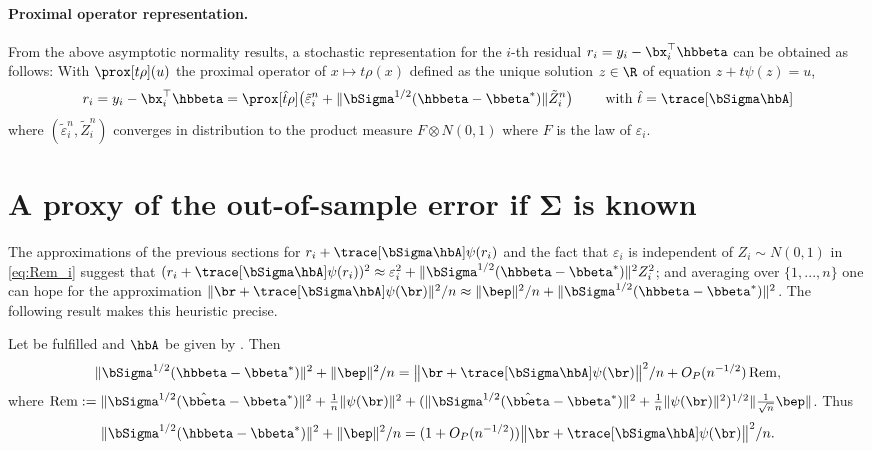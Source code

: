 \documentclass{colt2022} %
\DeclareMathOperator{\Rem}{Rem}
\def\eps{\varepsilon}
\numberwithin{equation}{section}
\begin{document}
\paragraph{Proximal operator representation.}
From the above asymptotic normality results,
a stochastic representation for the $i$-th residual
$r_i=y_i - \bx_i^\top\smash{\hbbeta}$ can be obtained as follows:
With $\prox[t\rho](u)$ the proximal operator of $x\mapsto t\rho(x)$
defined as the unique solution $z\in\R$ of equation
$z + t\psi(z) = u$,
$$
r_i = y_i - \bx_i^\top\hbbeta
= \prox[\hat t \rho]\bigl(
    \tilde \eps_i^n + \|\bSigma^{1/2}(\hbbeta-\bbeta^*)\| \tilde Z_i^n
\bigr) 
\qquad \text{ with } \hat t = \trace[\bSigma\hbA]
$$
where
$(\tilde \eps_i^n,\tilde Z_i^n)$ converges in distribution to 
the product measure $F\otimes N(0,1)$ where $F$ is the law of $\eps_i$.


\section{A proxy of the out-of-sample error if 
\texorpdfstring{$\mathbf{\Sigma}$}{bSigma} is known}
\label{sec:proxy}
The approximations of the previous sections
for $r_i + \trace[\bSigma\hbA]\psi(r_i)$
and the fact that $\eps_i$ is independent of $Z_i\sim N(0,1)$
in \eqref{eq:Rem_i} suggest that
$(r_i + \trace[\bSigma\hbA]\psi(r_i))^2
\approx \eps_i^2 + \|\bSigma^{1/2}(\hbbeta-\bbeta^*)\|^2Z_i^2$;
and averaging over $\{1,...,n\}$ one can hope for the approximation
$ \|\br + \trace[\bSigma\hbA]\psi(\br)\|^2/n
\approx \|\bep\|^2/n + \|\bSigma^{1/2}(\hbbeta-\bbeta^*)\|^2$.
The following result makes this heuristic precise.

\begin{theorem}
    \label{thm:out-of-sample}
    Let  be fulfilled
    and $\hbA$ be given by .
    Then 
    \begin{align*}
        \|\bSigma^{1/2}(\hbbeta-\bbeta^*)\|^2 + \|\bep\|^2/n
        = \big\| \br + \trace[\bSigma\hbA]\psi(\br)\big\|^2/n
        + O_P(n^{-1/2}) \Rem,
    \end{align*}
    where 
    $
    \Rem := 
     \| \bSigma^{1/2} (\hat \bbeta - \bbeta^*) \|^{2} 
    + \frac1n \| \psi (\br) \|^{2} 
    + (\| \bSigma^{1/2} (\hat \bbeta - \bbeta^*) \|^{2} 
    + \frac1n\| \psi (\br) \|^{2} )^{1/2} \| \frac{1}{\sqrt n}\bep\|
    $.
    Thus
    $$
        \|\bSigma^{1/2}(\hbbeta-\bbeta^*)\|^2 + \|\bep\|^2/n
        = (1+ O_P(n^{-1/2}))
        \big\| \br + \trace[\bSigma\hbA]\psi(\br)\big\|^2/n.
    $$
\end{theorem}
\end{document}
